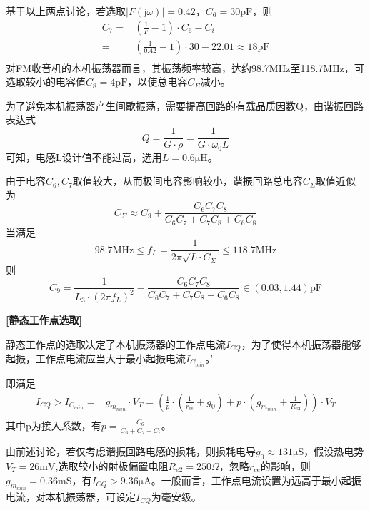 \documentclass[a4paper,12pt,twoside]{article}
\begin{document}
基于以上两点讨论，若选取$|F(\mathrm{j}\omega)|=0.42$，$C_6=30\mathrm{pF}$，则
\begin{equation}
    \begin{aligned}
    C_7=&(\frac{1}{F}-1)\cdot C_6-C_i\\
    =&(\frac{1}{0.42}-1)\cdot 30 - 22.01\approx 18\mathrm{pF}\\
    \end{aligned}
\end{equation}
对FM收音机的本机振荡器而言，其振荡频率较高，达约98.7MHz至118.7MHz，可选取较小的电容值$C_8=4\mathrm{pF}$，以使总电容$C_\Sigma$减小。


为了避免本机振荡器产生间歇振荡，需要提高回路的有载品质因数Q，由谐振回路表达式
\begin{equation}
    Q = \frac{1}{G\cdot\rho}=\frac{1}{G\cdot \omega_0 L}
\end{equation}
可知，电感L设计值不能过高，选用$L = 0.6\mathrm{\mu H}$。

由于电容$C_6,C_7$取值较大，从而极间电容影响较小，谐振回路总电容$C_{\Sigma}$取值近似为
\begin{equation}
    C_{\Sigma}\approx C_9 + \frac{C_6 C_7 C_8}{C_6C_7+C_7C_8+C_6C_8}
\end{equation}
当满足
\begin{equation}
    98.7\mathrm{MHz} \le f_{L}=\frac{1}{2\pi \sqrt{L\cdot C_\Sigma}}\le 118.7\mathrm{MHz}
    \label{7式}
\end{equation}
则
\begin{equation}
    C_9 = \frac{1}{L_3\cdot (2\pi f_L)^2}-\frac{C_6 C_7 C_8}{C_6C_7+C_7C_8+C_6C_8}
    \in (0.03,1.44)\mathrm{pF}
\end{equation}

\vspace{2pt}
\textbf{[静态工作点选取]}

静态工作点的选取决定了本机振荡器的工作点电流$I_{CQ}$，为了使得本机振荡器能够起振，工作点电流应当大于最小起振电流$I_{C_{min}}$。'

即满足
\begin{equation}
    \begin{aligned}
    I_{CQ} > I_{C_{min}}=&g_{m_{min}}\cdot V_{T} = (\frac{1}{p}\cdot (\frac{1}{r_{ce}}+g_0)+p\cdot (g_{m_{min}}+\frac{1}{R_{e2}})) \cdot V_{T}\\
    \end{aligned}
\end{equation}
 其中p为接入系数，有$p=\frac{C_6}{C_6+C_7+C_i}$。

由前述讨论，若仅考虑谐振回路电感的损耗，则损耗电导$g_0\approx 131\mathrm{\mu S}$，假设热电势$V_{T}=26\mathrm{mV}$,选取较小的射极偏置电阻$R_{e2}=250\Omega$，忽略$r_{ce}$的影响，则$g_{m_{min}}=0.36\mathrm{mS}$，有$I_{CQ}>9.36\mathrm{\mu A}$。一般而言，工作点电流设置为远高于最小起振电流，对本机振荡器，可设定$I_{CQ}$为毫安级。
\end{document}
